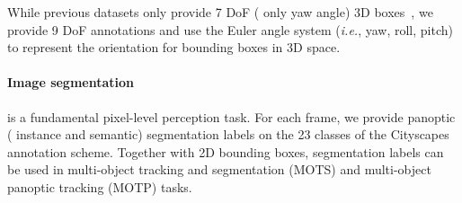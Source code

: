While previous datasets only provide 7 DoF (\ie{} only yaw angle) 3D boxes~\cite{geiger2013vision,caesar2020nuscenes,sun2020scalability}, we provide 9 DoF annotations and use the Euler angle system (\textit{i.e.}, yaw, roll, pitch) to represent the orientation for bounding boxes in 3D space.

\paragraph{Image segmentation} is a fundamental pixel-level perception task. 
For each frame, we provide panoptic (\ie{} instance and semantic) segmentation labels on the 23 classes of the Cityscapes~\cite{cordts2016cityscapes} annotation scheme. 
Together with 2D bounding boxes, segmentation labels can be used in multi-object tracking and segmentation (MOTS) and multi-object panoptic tracking (MOTP) tasks.

